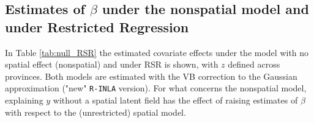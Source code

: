 \documentclass[openany]{book}
\begin{document}
\begin{appendices}
\subsection{Estimates of $\beta$ under the nonspatial model and under Restricted Regression} \label{Appendix:null_RSR}

In Table \ref{tab:null_RSR} the estimated covariate effects under the model with no spatial effect (nonspatial) and under RSR is shown, with $z$ defined across provinces. Both models are estimated with the VB correction to the Gaussian approximation ("new" \texttt{R-INLA} version).%
For what concerns the nonspatial model, explaining $y$ without a spatial latent field has the effect of raising estimates of $\beta$ with respect to the (unrestricted) spatial model. 



\end{appendices}
\end{document}
